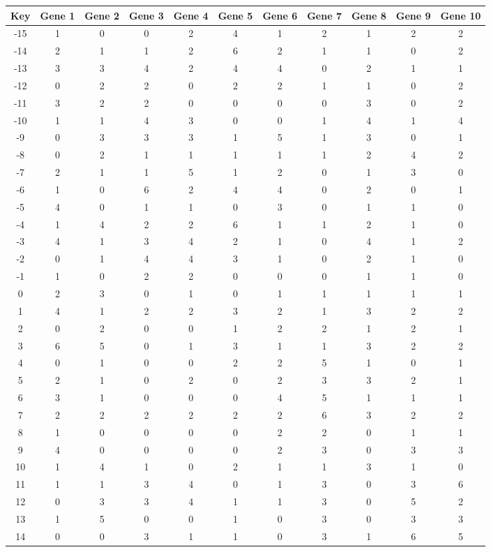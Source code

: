 \begin{tabular}{|c|c|c|c|c|c|c|c|c|c|c|}
\hline
Key & Gene 1 & Gene 2 & Gene 3 & Gene 4 & Gene 5 & Gene 6 & Gene 7 & Gene 8 & Gene 9 & Gene 10 \\
\hline
-15 & 1 & 0 & 0 & 2 & 4 & 1 & 2 & 1 & 2 & 2 \\
-14 & 2 & 1 & 1 & 2 & 6 & 2 & 1 & 1 & 0 & 2 \\
-13 & 3 & 3 & 4 & 2 & 4 & 4 & 0 & 2 & 1 & 1 \\
-12 & 0 & 2 & 2 & 0 & 2 & 2 & 1 & 1 & 0 & 2 \\
-11 & 3 & 2 & 2 & 0 & 0 & 0 & 0 & 3 & 0 & 2 \\
-10 & 1 & 1 & 4 & 3 & 0 & 0 & 1 & 4 & 1 & 4 \\
-9 & 0 & 3 & 3 & 3 & 1 & 5 & 1 & 3 & 0 & 1 \\
-8 & 0 & 2 & 1 & 1 & 1 & 1 & 1 & 2 & 4 & 2 \\
-7 & 2 & 1 & 1 & 5 & 1 & 2 & 0 & 1 & 3 & 0 \\
-6 & 1 & 0 & 6 & 2 & 4 & 4 & 0 & 2 & 0 & 1 \\
-5 & 4 & 0 & 1 & 1 & 0 & 3 & 0 & 1 & 1 & 0 \\
-4 & 1 & 4 & 2 & 2 & 6 & 1 & 1 & 2 & 1 & 0 \\
-3 & 4 & 1 & 3 & 4 & 2 & 1 & 0 & 4 & 1 & 2 \\
-2 & 0 & 1 & 4 & 4 & 3 & 1 & 0 & 2 & 1 & 0 \\
-1 & 1 & 0 & 2 & 2 & 0 & 0 & 0 & 1 & 1 & 0 \\
0 & 2 & 3 & 0 & 1 & 0 & 1 & 1 & 1 & 1 & 1 \\
1 & 4 & 1 & 2 & 2 & 3 & 2 & 1 & 3 & 2 & 2 \\
2 & 0 & 2 & 0 & 0 & 1 & 2 & 2 & 1 & 2 & 1 \\
3 & 6 & 5 & 0 & 1 & 3 & 1 & 1 & 3 & 2 & 2 \\
4 & 0 & 1 & 0 & 0 & 2 & 2 & 5 & 1 & 0 & 1 \\
5 & 2 & 1 & 0 & 2 & 0 & 2 & 3 & 3 & 2 & 1 \\
6 & 3 & 1 & 0 & 0 & 0 & 4 & 5 & 1 & 1 & 1 \\
7 & 2 & 2 & 2 & 2 & 2 & 2 & 6 & 3 & 2 & 2 \\
8 & 1 & 0 & 0 & 0 & 0 & 2 & 2 & 0 & 1 & 1 \\
9 & 4 & 0 & 0 & 0 & 0 & 2 & 3 & 0 & 3 & 3 \\
10 & 1 & 4 & 1 & 0 & 2 & 1 & 1 & 3 & 1 & 0 \\
11 & 1 & 1 & 3 & 4 & 0 & 1 & 3 & 0 & 3 & 6 \\
12 & 0 & 3 & 3 & 4 & 1 & 1 & 3 & 0 & 5 & 2 \\
13 & 1 & 5 & 0 & 0 & 1 & 0 & 3 & 0 & 3 & 3 \\
14 & 0 & 0 & 3 & 1 & 1 & 0 & 3 & 1 & 6 & 5 \\
\hline
\end{tabular}
